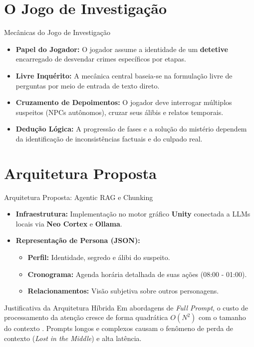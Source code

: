 \documentclass[11pt]{beamer}
\begin{document}
\section{O Jogo de Investigação}

\begin{frame}{Mecânicas do Jogo de Investigação}
\begin{itemize}
    \item \textbf{Papel do Jogador:} O jogador assume a identidade de um \textbf{detetive} encarregado de desvendar crimes específicos por etapas.
    \item \textbf{Livre Inquérito:} A mecânica central baseia-se na formulação livre de perguntas por meio de entrada de texto direto.
    \item \textbf{Cruzamento de Depoimentos:} O jogador deve interrogar múltiplos suspeitos (NPCs autônomos), cruzar seus álibis e relatos temporais.
    \item \textbf{Dedução Lógica:} A progressão de fases e a solução do mistério dependem da identificação de inconsistências factuais e do culpado real.
\end{itemize}
\end{frame}

\section{Arquitetura Proposta}

\begin{frame}{Arquitetura Proposta: Agentic RAG e Chunking}
\begin{itemize}
    \item \textbf{Infraestrutura:} Implementação no motor gráfico \textbf{Unity} conectada a LLMs locais via \textbf{Neo Cortex} e \textbf{Ollama}.
    \item \textbf{Representação de Persona (JSON):}
    \begin{itemize}
        \item \textbf{Perfil:} Identidade, segredo e álibi do suspeito.
        \item \textbf{Cronograma:} Agenda horária detalhada de suas ações (08:00 - 01:00).
        \item \textbf{Relacionamentos:} Visão subjetiva sobre outros personagens.
    \end{itemize}
\end{itemize}
\begin{block}{Justificativa da Arquitetura Híbrida}
Em abordagens de \textit{Full Prompt}, o custo de processamento da atenção cresce de forma quadrática $O(N^2)$ com o tamanho do contexto \cite{ref4}. Prompts longos e complexos causam o fenômeno de perda de contexto (\textit{Lost in the Middle}) \cite{liu2023lost} e alta latência.
\end{block}
\end{frame}
\end{document}
